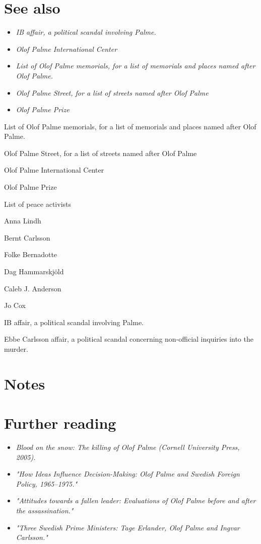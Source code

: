 \section{See also}\label{see-also}

\begin{itemize}
\item
  \emph{IB affair, a political scandal involving Palme.}
\item
  \emph{Olof Palme International Center}
\item
  \emph{List of Olof Palme memorials, for a list of memorials and places
  named after Olof Palme.}
\item
  \emph{Olof Palme Street, for a list of streets named after Olof Palme}
\item
  \emph{Olof Palme Prize}
\end{itemize}

List of Olof Palme memorials, for a list of memorials and places named
after Olof Palme.

Olof Palme Street, for a list of streets named after Olof Palme

Olof Palme International Center

Olof Palme Prize

List of peace activists

Anna Lindh

Bernt Carlsson

Folke Bernadotte

Dag Hammarskjöld

Caleb J. Anderson

Jo Cox

IB affair, a political scandal involving Palme.

Ebbe Carlsson affair, a political scandal concerning non-official
inquiries into the murder.

\section{Notes}\label{notes}

\section{Further reading}\label{further-reading}

\begin{itemize}
\item
  \emph{Blood on the snow: The killing of Olof Palme (Cornell University
  Press, 2005).}
\item
  \emph{"How Ideas Influence Decision-Making: Olof Palme and Swedish
  Foreign Policy, 1965--1975."}
\item
  \emph{"Attitudes towards a fallen leader: Evaluations of Olof Palme
  before and after the assassination."}
\item
  \emph{"Three Swedish Prime Ministers: Tage Erlander, Olof Palme and
  Ingvar Carlsson."}
\end{itemize}

